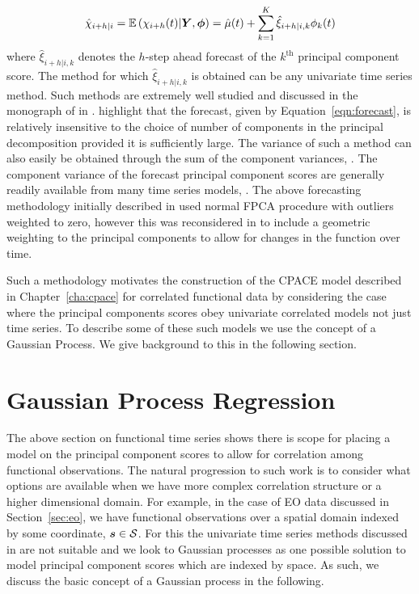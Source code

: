 \begin{equation}\label{eqn:forecast}
	\hat{\chi}_{i+h | i} = \operatorname{\mathbb{E}}\left(\chi_{i+h}(t) | \bm{{Y}}, \bm{{\phi}}\right) = \hat{\mu}(t) + \sum_{k=1}^K \hat{\xi}_{i+h | i, k} \phi_k(t) 
\end{equation}
where $\hat{\xi}_{i+h | i, k}$ denotes the $h$-step ahead forecast of the $k^\text{th}$ principal component score.
The method for which $\hat{\xi}_{i+h | i, k}$ is obtained can be any univariate time series method. Such methods are extremely well studied and discussed in the monograph of \citeauthor{hyndman_forecasting_2018} in \citep{hyndman_forecasting_2018}.
\citeauthor{hyndman_stochastic_2008} highlight that the forecast, given by Equation~\eqref{eqn:forecast}, is relatively insensitive to the choice of number of components in the principal decomposition provided it is sufficiently large.
The variance of such a method can also easily be obtained through the sum of the component variances, \citep{hyndman_stochastic_2008}.
The component variance of the forecast principal component scores are generally readily available from many time series models, \citep{hyndman_forecasting_2018}. 
The above forecasting methodology initially described in \citep{hyndman_robust_2007} used normal FPCA procedure with outliers weighted to zero, however this was reconsidered in \citep{hyndman_forecasting_2009} to include a geometric weighting to the principal components to allow for changes in the function over time. 

Such a methodology motivates the construction of the CPACE model described in Chapter~\ref{cha:cpace} for correlated functional data by considering the case where the principal components scores obey univariate correlated models not just time series. To describe some of these such models we use the concept of a Gaussian Process. We give background to this in the following section. 

\section{Gaussian Process Regression \label{sec:gp}}
The above section on functional time series shows there is scope for placing a model on the principal component scores to allow for correlation among functional observations.
The natural progression to such work is to consider what options are available when we have more complex correlation structure or a higher dimensional domain. 
For example, in the case of EO data discussed in Section~\ref{sec:eo}, we have functional observations over a spatial domain indexed by some coordinate, $\bm{{s}} \in \mathcal{S}$.
For this the univariate time series methods discussed in \citep{hyndman_forecasting_2009} are not suitable and we look to Gaussian processes as one possible solution to model principal component scores which are indexed by space.
As such, we discuss the basic concept of a Gaussian process in the following. 

